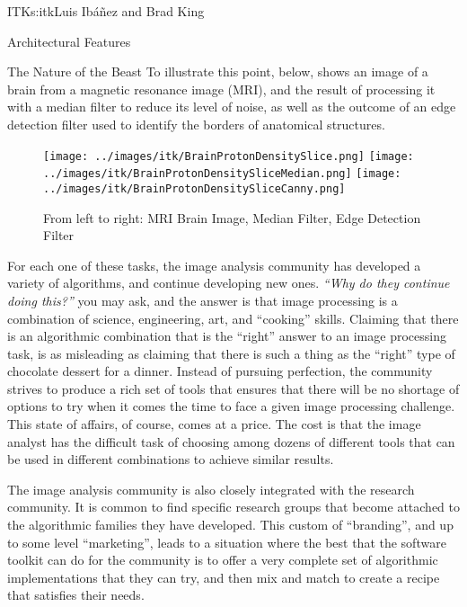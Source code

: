 \begin{aosachapter}{ITK}{s:itk}{Luis Ib\'{a}\~{n}ez and Brad King}
\begin{aosasect1}{Architectural Features}
\begin{aosasect2}{The Nature of the Beast}
To illustrate this point,  below, shows an image of a
brain from a magnetic resonance image (MRI), and the result of processing it
with a median filter to reduce its level of noise, as well as the outcome of an
edge detection filter used to identify the borders of anatomical structures.



%
%
%
\begin{figure}[h!]
\centering
\texttt{[image: ../images/itk/BrainProtonDensitySlice.png]}
\texttt{[image: ../images/itk/BrainProtonDensitySliceMedian.png]}
\texttt{[image: ../images/itk/BrainProtonDensitySliceCanny.png]}
\caption{From left to right: MRI Brain Image, Median Filter, Edge Detection Filter}
\label{fig.itk.brim}
\end{figure}

For each one of these tasks, the image analysis community has developed a
variety of algorithms, and continue developing new ones. \emph{``Why do they
continue doing this?''} you may ask, and the answer is that image processing is
a combination of science, engineering, art, and ``cooking'' skills. Claiming
that there is an algorithmic combination that is the ``right'' answer to an
image processing task, is as misleading as claiming that there is such a thing as
the ``right'' type of chocolate dessert for a dinner. Instead of pursuing
perfection, the community strives to produce a rich set of tools that
ensures that there will be no shortage of options to try when it comes the
time to face a given image processing challenge. This state of
affairs, of course, comes at a price. The cost is that the image
analyst has the difficult task of choosing among dozens of different
tools that can be used in different combinations to achieve similar
results.

The image analysis community is also closely integrated with the research
community. It is common to find specific research groups that become attached
to the algorithmic families they have developed. This custom of ``branding'',
and up to some level ``marketing'', leads to a situation where the best that the
software toolkit can do for the community is to offer a very complete set of
algorithmic implementations that they can try, and then mix and match to create
a recipe that satisfies their needs.


\end{aosasect2}
\end{aosasect1}
\end{aosachapter}
